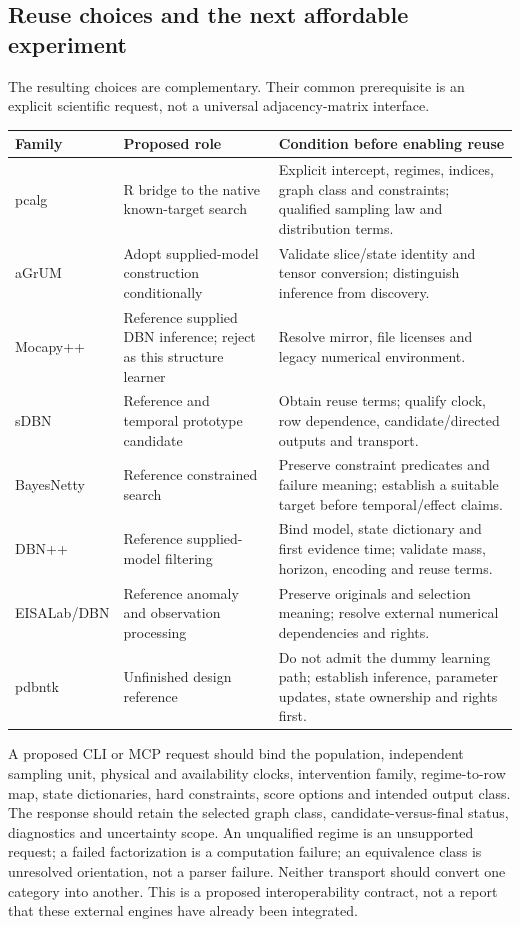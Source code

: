 \subsection{Reuse choices and the next affordable experiment}

The resulting choices are complementary. Their common prerequisite is an
explicit scientific request, not a universal adjacency-matrix interface.

\begin{longtable}{P{0.15\textwidth}P{0.34\textwidth}P{0.43\textwidth}}
\toprule
Family & Proposed role & Condition before enabling reuse\\
\midrule
\endhead
pcalg & R bridge to the native known-target search & Explicit intercept, regimes,
indices, graph class and constraints; qualified sampling law and distribution terms.\\
aGrUM & Adopt supplied-model construction conditionally & Validate slice/state
identity and tensor conversion; distinguish inference from discovery.\\
Mocapy++ & Reference supplied DBN inference; reject as this structure learner &
Resolve mirror, file licenses and legacy numerical environment.\\
sDBN & Reference and temporal prototype candidate & Obtain reuse terms; qualify
clock, row dependence, candidate/directed outputs and transport.\\
BayesNetty & Reference constrained search & Preserve constraint predicates and
failure meaning; establish a suitable target before temporal/effect claims.\\
DBN++ & Reference supplied-model filtering & Bind model, state dictionary and first evidence time; validate mass, horizon, encoding and reuse terms.\\
EISALab/\allowbreak DBN & Reference anomaly and observation processing & Preserve originals and selection meaning; resolve external numerical dependencies and rights.\\
pdbntk & Unfinished design reference & Do not admit the dummy learning path; establish inference, parameter updates, state ownership and rights first.\\
\bottomrule
\end{longtable}

A proposed CLI or MCP request should bind the population, independent sampling
unit, physical and availability clocks, intervention family, regime-to-row map,
state dictionaries, hard constraints, score options and intended output class.
The response should retain the selected graph class, candidate-versus-final
status, diagnostics and uncertainty scope. An unqualified regime is an
unsupported request; a failed factorization is a computation failure; an
equivalence class is unresolved orientation, not a parser failure. Neither
transport should convert one category into another. This is a proposed
interoperability contract, not a report that these external engines have
already been integrated. \citep{exec16_ct_design}

